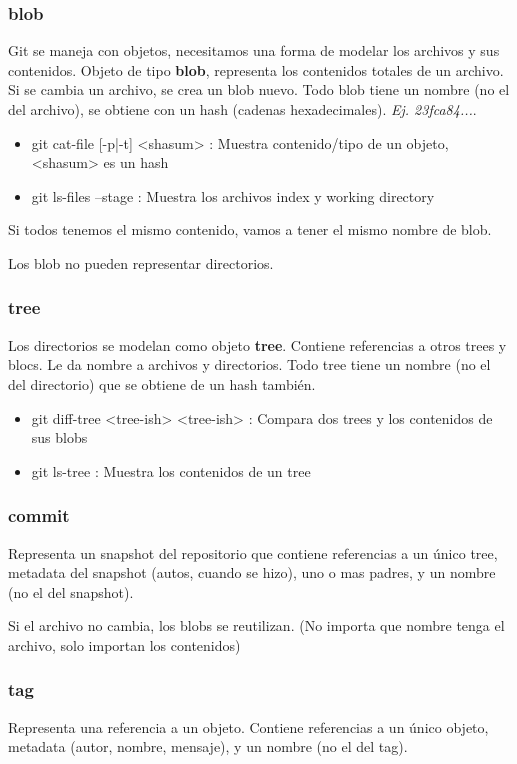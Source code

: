 \documentclass[titlepage,a4paper]{article}
\begin{document}
\subsubsection*{blob}
Git se maneja con objetos, necesitamos una forma de modelar los archivos y sus contenidos. Objeto de tipo \textbf{blob}, representa los contenidos totales de un archivo. Si se cambia un archivo, se crea un blob nuevo. Todo blob tiene un nombre (no el del archivo), se obtiene con un hash (cadenas hexadecimales). \textit{Ej. 23fca84...}. 

\begin{itemize}
    \item git cat-file [-p|-t] <shasum> : Muestra contenido/tipo de un objeto, <shasum> es un hash
    \item git ls-files --stage : Muestra los archivos index y working directory
\end{itemize}

Si todos tenemos el mismo contenido, vamos a tener el mismo nombre de blob.

Los blob no pueden representar directorios.

\subsubsection*{tree}
Los directorios se modelan como objeto \textbf{tree}. Contiene referencias a otros trees y blocs. Le da nombre a archivos y directorios. Todo tree tiene un nombre (no el del directorio) que se obtiene de un hash también.

\begin{itemize}
    \item git diff-tree <tree-ish> <tree-ish> : Compara dos trees y los contenidos de sus blobs
    \item git ls-tree : Muestra los contenidos de un tree
\end{itemize}

\subsubsection*{commit}
Representa un snapshot del repositorio que contiene referencias a un único tree, metadata del snapshot (autos, cuando se hizo), uno o mas padres, y un nombre (no el del snapshot).

Si el archivo no cambia, los blobs se reutilizan. (No importa que nombre tenga el archivo, solo importan los contenidos)

\subsubsection*{tag}
Representa una referencia a un objeto. Contiene referencias a un único objeto, metadata (autor, nombre, mensaje), y un nombre (no el del tag).
\end{document}
